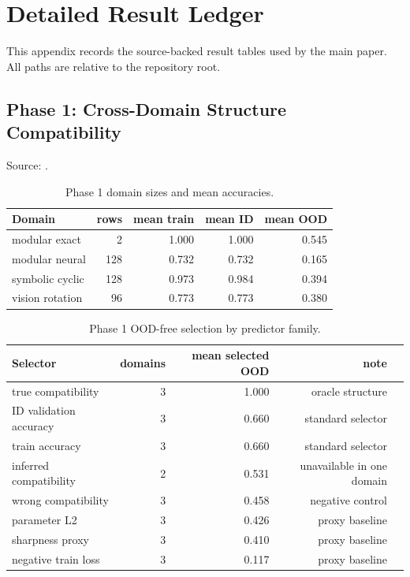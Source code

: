 \section{Detailed Result Ledger}
\label{app:results}

This appendix records the source-backed result tables used by the main paper.
All paths are relative to the repository root.

\subsection{Phase 1: Cross-Domain Structure Compatibility}

Source:
.

\begin{table}[h]
\centering
\small
\begin{tabular}{lrrrr}
\toprule
Domain & rows & mean train & mean ID & mean OOD \\
\midrule
modular exact & 2 & 1.000 & 1.000 & 0.545 \\
modular neural & 128 & 0.732 & 0.732 & 0.165 \\
symbolic cyclic & 128 & 0.973 & 0.984 & 0.394 \\
vision rotation & 96 & 0.773 & 0.773 & 0.380 \\
\bottomrule
\end{tabular}
\caption{Phase 1 domain sizes and mean accuracies.}
\end{table}

\begin{table}[h]
\centering
\small
\begin{tabular}{lrrrr}
\toprule
Selector & domains & mean selected OOD & note \\
\midrule
true compatibility & 3 & 1.000 & oracle structure \\
ID validation accuracy & 3 & 0.660 & standard selector \\
train accuracy & 3 & 0.660 & standard selector \\
inferred compatibility & 2 & 0.531 & unavailable in one domain \\
wrong compatibility & 3 & 0.458 & negative control \\
parameter L2 & 3 & 0.426 & proxy baseline \\
sharpness proxy & 3 & 0.410 & proxy baseline \\
negative train loss & 3 & 0.117 & proxy baseline \\
\bottomrule
\end{tabular}
\caption{Phase 1 OOD-free selection by predictor family.}
\end{table}

